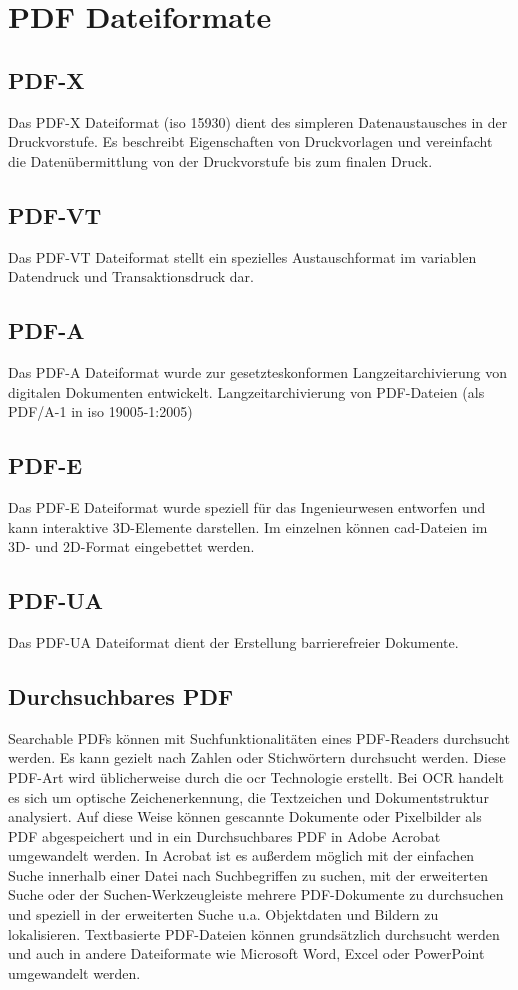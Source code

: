 \section{PDF Dateiformate}

\subsection{PDF-X}
Das PDF-X Dateiformat (\gls{iso} 15930) dient des simpleren Datenaustausches in der Druckvorstufe. Es beschreibt Eigenschaften von Druckvorlagen und vereinfacht die Datenübermittlung von der Druckvorstufe bis zum finalen Druck.

\subsection{PDF-VT}
Das PDF-VT Dateiformat stellt ein spezielles Austauschformat im variablen Datendruck und Transaktionsdruck dar.

\subsection{PDF-A}
Das PDF-A Dateiformat wurde zur gesetzteskonformen Langzeitarchivierung von digitalen Dokumenten entwickelt.
Langzeitarchivierung von PDF-Dateien (als PDF/A-1 in \gls{iso} 19005-1:2005) 

\subsection{PDF-E}
Das PDF-E Dateiformat wurde speziell für das Ingenieurwesen entworfen und kann interaktive 3D-Elemente darstellen. Im einzelnen können \gls{cad}-Dateien im 3D- und 2D-Format eingebettet werden.

\subsection{PDF-UA}
Das PDF-UA Dateiformat dient der Erstellung barrierefreier Dokumente.

\subsection{Durchsuchbares PDF}
Searchable PDFs können mit Suchfunktionalitäten eines PDF-Readers durchsucht werden. Es kann gezielt nach Zahlen oder Stichwörtern durchsucht werden. Diese PDF-Art wird üblicherweise durch die \gls{ocr} Technologie erstellt. Bei OCR handelt es sich um optische Zeichenerkennung, die Textzeichen und Dokumentstruktur analysiert. Auf diese Weise können gescannte Dokumente oder Pixelbilder als PDF abgespeichert und in ein Durchsuchbares PDF in Adobe Acrobat umgewandelt werden. In Acrobat ist es außerdem möglich mit der einfachen Suche innerhalb einer Datei nach Suchbegriffen zu suchen, mit der erweiterten Suche oder der Suchen-Werkzeugleiste mehrere PDF-Dokumente zu durchsuchen und speziell in der erweiterten Suche u.a. Objektdaten und Bildern zu lokalisieren. Textbasierte PDF-Dateien können grundsätzlich durchsucht werden und auch in andere Dateiformate wie Microsoft Word, Excel oder PowerPoint umgewandelt werden.
\cite{adobe-search}

